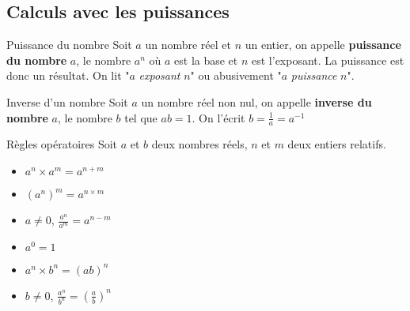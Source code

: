 
\begin{pageCours} %


\section{Calculs avec les puissances}

\begin{DefT}{Puissance du nombre}
Soit $a$ un nombre réel et $n$ un entier, on appelle \textbf{puissance du nombre} $a$, le nombre $a^n$ où $a$ est la base et $n$ est l'exposant. La puissance est donc un résultat. On lit "$a$ \textit{exposant} $n$" ou abusivement "$a$ \textit{puissance} $n$".
\end{DefT}


\begin{DefT}{Inverse d'un nombre}
Soit $a$ un nombre réel non nul, on appelle \textbf{inverse du nombre} $a$, le nombre $b$ tel que $ab=1$. On l'écrit $b=\frac{1}{a}=a^{-1}$
\end{DefT}





\begin{ThT}{Règles opératoires}
Soit $a$ et $b$ deux nombres réels, $n$ et $m$ deux entiers relatifs.


\begin{minipage}{0.33\linewidth}
\begin{itemize}
\item $a^n \times a^m = a^{n+m}$ 
\item $\left(a^n \right)^m =a^{n\times m}$ 

\end{itemize}
\end{minipage}
\begin{minipage}{0.33\linewidth}
\begin{itemize}
\item $a \neq 0$, $\frac{a^n}{a^m} = a^{n-m} $ 
\item $a^0=1 $
 
\end{itemize}
\end{minipage}
\begin{minipage}{0.33\linewidth}
\begin{itemize}
\item $a^n \times b^n = (ab)^n$ 
\item $b \neq 0$, $\frac{a^n}{b^n} = \left( \frac{a}{b} \right)^n $ 
\end{itemize}
\end{minipage}


\end{ThT}
\end{pageCours}
